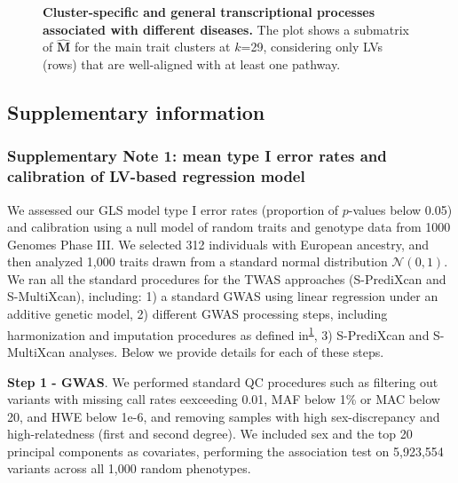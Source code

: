 \documentclass[
  a4paper,
]{article}
\begin{document}
\begin{figure}
\hypertarget{fig:clustering:heatmap}{%
\centering
% 
\caption{\textbf{Cluster-specific and general transcriptional processes associated with different diseases.}
The plot shows a submatrix of \(\hat{\mathbf{M}}\) for the main trait clusters at \(k\)=29, considering only LVs (rows) that are well-aligned with at least one pathway.}\label{fig:clustering:heatmap}
}
\end{figure}

\clearpage

\hypertarget{supplementary-information}{%
\subsection{Supplementary information}\label{supplementary-information}}

\setcounter{figure}{0}
\setcounter{table}{0}

\hypertarget{sm:reg:null_sim}{%
\subsubsection{Supplementary Note 1: mean type I error rates and calibration of LV-based regression model}\label{sm:reg:null_sim}}

We assessed our GLS model type I error rates (proportion of \(p\)-values below 0.05) and calibration using a null model of random traits and genotype data from 1000 Genomes Phase III.
We selected 312 individuals with European ancestry, and then analyzed 1,000 traits drawn from a standard normal distribution \(\mathcal{N}(0,1)\).
We ran all the standard procedures for the TWAS approaches (S-PrediXcan and S-MultiXcan), including:
1) a standard GWAS using linear regression under an additive genetic model,
2) different GWAS processing steps, including harmonization and imputation procedures as defined in\textsuperscript{\protect\hyperlink{ref-SiobXsoB}{1}},
3) S-PrediXcan and S-MultiXcan analyses.
Below we provide details for each of these steps.

\textbf{Step 1 - GWAS}. We performed standard QC procedures such as
filtering out variants with missing call rates eexceeding 0.01, MAF below 1\% or MAC below 20, and HWE below 1e-6,
and removing samples with high sex-discrepancy and high-relatedness (first and second degree).
We included sex and the top 20 principal components as covariates, performing the association test on 5,923,554 variants across all 1,000 random phenotypes.
\end{document}

